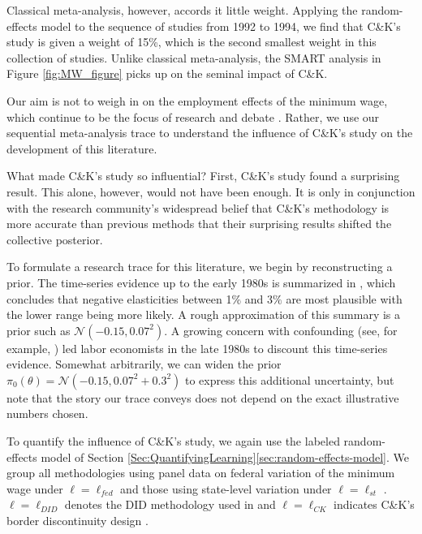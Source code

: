 Classical meta-analysis, however, accords it little weight. Applying the random-effects model to the sequence of studies from 1992 to 1994, we find that C\&K's study is given a weight of 15\%, which is the second smallest weight in this collection of studies. Unlike classical meta-analysis, the SMART analysis in Figure \ref{fig:MW_figure} picks up on the seminal impact of C\&K.


Our aim is not to weigh in on the employment effects of the minimum
wage, which continue to be the focus of research and
debate \citep{Neumark_Shirley_22,Manning_21}. Rather, we use our
sequential meta-analysis trace to understand the influence of C\&K's study on the development of
this literature. 

What made C\&K's study so influential?  First, C\&K's study found a surprising result. This alone,
however, would not have been enough. It is only in conjunction with
the research community's widespread belief that
C\&K's methodology is more accurate than previous methods that
their surprising results shifted the collective posterior.

To formulate a research trace for this literature, we begin by reconstructing a prior. The time-series evidence up to the early 1980s is summarized in \citep{Brown_82}, which concludes that negative elasticities between 1$\%$ and 3$\%$ are most plausible with the lower range being more likely. A rough approximation of this summary is a prior such as $\mathcal{N}(-0.15,0.07^2)$.  
A growing concern with confounding (see, for example, \citep{LaLonde_86})  led labor economists in the late 1980s to discount this time-series evidence. Somewhat arbitrarily, we can widen the prior $\pi_0(\theta) = \mathcal{N}(-0.15,0.07^2+0.3^2)$ to express this additional uncertainty, but note that the story our trace conveys does not depend on the exact illustrative numbers chosen.

To quantify the influence of C\&K's study, we again use the labeled
random-effects model of Section \ref{Sec:QuantifyingLearning}\ref{sec:random-effects-model}.  We group all methodologies using panel data on federal variation of the minimum wage under $\ell=\ell_{fed}$ \citep{Cardb_1992,Katz_92,Williams_93} and those using state-level variation under $\ell=\ell_{st}$ \citep{Neumark_1992}. $\ell=\ell_{DID}$ denotes the DID methodology used in \citep{Card_92} and $\ell =\ell_{CK}$ indicates C\&K's border discontinuity design \citep{Card_Krueger_94}.

